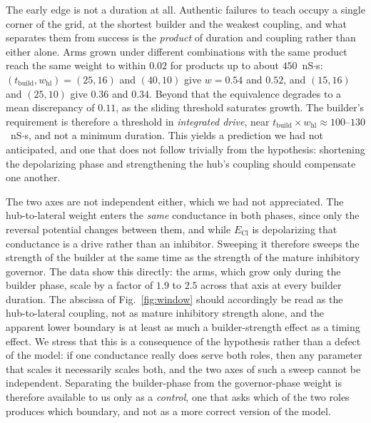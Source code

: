 \documentclass[11pt,a4paper]{article}
\newcommand{\ECl}{E_{\mathrm{Cl}}}
\begin{document}
The early edge is not a duration at all. Authentic failures to teach occupy a single corner of the grid, at the shortest builder and the weakest coupling, and what separates them from success is the \emph{product} of duration and coupling rather than either alone. Arms grown under different combinations with the same product reach the same weight to within $0.02$ for products up to about $450$~nS$\cdot$s: $(t_{\mathrm{build}},w_{\mathrm{hl}})=(25,16)$ and $(40,10)$ give $w=0.54$ and $0.52$, and $(15,16)$ and $(25,10)$ give $0.36$ and $0.34$. Beyond that the equivalence degrades to a mean discrepancy of $0.11$, as the sliding threshold saturates growth. The builder's requirement is therefore a threshold in \emph{integrated drive}, near $t_{\mathrm{build}}\times w_{\mathrm{hl}}\approx100$--$130$~nS$\cdot$s, and not a minimum duration. This yields a prediction we had not anticipated, and one that does not follow trivially from the hypothesis: shortening the depolarizing phase and strengthening the hub's coupling should compensate one another.

The two axes are not independent either, which we had not appreciated. The hub-to-lateral weight enters the \emph{same} conductance in both phases, since only the reversal potential changes between them, and while $\ECl$ is depolarizing that conductance is a drive rather than an inhibitor. Sweeping it therefore sweeps the strength of the builder at the same time as the strength of the mature inhibitory governor. The data show this directly: the arms, which grow only during the builder phase, scale by a factor of $1.9$ to $2.5$ across that axis at every builder duration. The abscissa of Fig.~\ref{fig:window} should accordingly be read as the hub-to-lateral coupling, not as mature inhibitory strength alone, and the apparent lower boundary is at least as much a builder-strength effect as a timing effect. We stress that this is a consequence of the hypothesis rather than a defect of the model: if one conductance really does serve both roles, then any parameter that scales it necessarily scales both, and the two axes of such a sweep cannot be independent. Separating the builder-phase from the governor-phase weight is therefore available to us only as a \emph{control}, one that asks which of the two roles produces which boundary, and not as a more correct version of the model.
\end{document}
